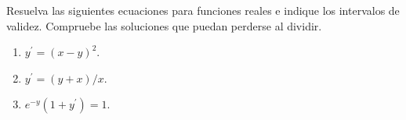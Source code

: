 Resuelva las siguientes ecuaciones para funciones reales e indique los intervalos de validez. Compruebe las soluciones que puedan perderse al dividir.

\begin{enumerate}[label=(\alph*),ref=\alph*,leftmargin=*]
\item $y^{\prime}=(x-y)^2$.
\item $y^{\prime}=(y+x)/x$.
\item $e^{-y}(1+y^{\prime})=1$.
\end{enumerate}
